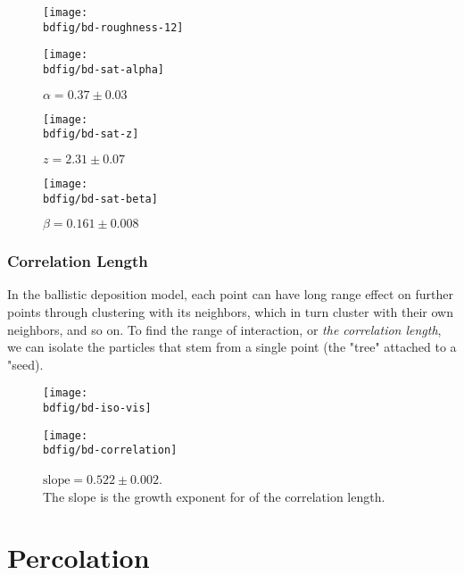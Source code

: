 \documentclass[12pt,a4paper]{article}
\newcommand{\bdfig}{../fig/ballistic-deposition}
\begin{document}
    \begin{figure}
        \centering
        \texttt{[image: \\bdfig/bd-roughness-12]}
    \end{figure}
    \begin{figure}
        \centering
        \texttt{[image: \\bdfig/bd-sat-alpha]}
        \caption{$\alpha = 0.37\pm0.03$}
    \end{figure}
    \begin{figure}
        \centering
        \texttt{[image: \\bdfig/bd-sat-z]}
        \caption{$z = 2.31\pm0.07$}
    \end{figure}
    \begin{figure}
        \centering
        \texttt{[image: \\bdfig/bd-sat-beta]}
        \caption{$\beta = 0.161\pm0.008$}
    \end{figure}
    \restoregeometry
    \subsubsection{Correlation Length}
    In the ballistic deposition model, each point can have long range effect on further points through clustering with
    its neighbors, which in turn cluster with their own neighbors, and so on. To find the range of interaction, or
    \emph{the correlation length}, we can isolate the particles that stem from a single point
    (the "tree" attached to a "seed).
    \begin{figure}
        \centering
        \texttt{[image: \\bdfig/bd-iso-vis]}
    \end{figure}
    \begin{figure}
        \centering
        \texttt{[image: \\bdfig/bd-correlation]}
        \caption{$\text{slope} = 0.522\pm0.002$.\\The slope is the growth exponent for of the correlation length.}
    \end{figure}
    \section{Percolation}
\end{document}
